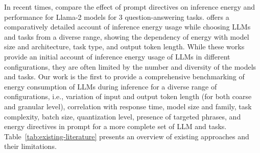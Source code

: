 In recent times, \citet{li2024toward} compare the effect of prompt directives on inference energy and performance for Llama-2 models for 3 question-answering tasks. \citet{luccioni2024power} offers a comparatively detailed account of inference energy usage while choosing LLMs and tasks from a diverse range, showing the dependency of energy with model size and architecture, task type, and output token length. While these works provide an initial account of inference energy usage of LLMs in different configurations, they are often limited by the number and diversity of the models and tasks. Our work is the first to provide a comprehensive benchmarking of energy consumption of LLMs during inference for a diverse range of configurations, i.e., variation of input and output token length (for both coarse and granular level), correlation with response time, model size and family, task complexity, batch size, quantization level, presence of targeted phrases, and energy directives in prompt for a more complete set of LLM and tasks.
%
Table~\ref{tab:existing-literature} presents an overview of existing approaches and their limitations.



